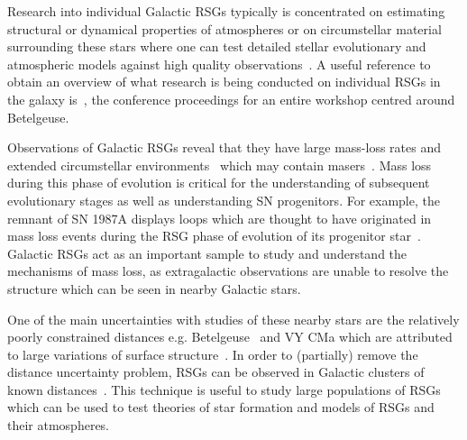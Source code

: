 
Research into individual Galactic RSGs typically is concentrated on estimating structural or dynamical properties of atmospheres or on circumstellar material surrounding these stars where one can test detailed stellar evolutionary and atmospheric models against high quality observations~\citep[e.g.][]{2014A&A...561A..15C}.
A useful reference to obtain an overview of what research is being conducted on individual RSGs in the galaxy is~\cite{2013EAS....60.....K}, the conference proceedings for an entire workshop centred around Betelgeuse.

Observations of Galactic RSGs reveal that they have large mass-loss rates
\citep[10$^{-(6\pm 1)}$\,M$_{\odot}$\,yr$^{-1}$;][]{Danchi94, Richards13,2016AJ....151...51S} and extended circumstellar environments~\citep{Smith01,2014MNRAS.437L...1W} which may contain masers~\citep[e.g.][]{Schuster06,2012ApJ...744...23Z}.
Mass loss during this phase of evolution is critical for the understanding of subsequent evolutionary stages as well as understanding SN progenitors.
For example, the remnant of SN 1987A displays loops which are thought to have originated in mass loss events during the RSG phase of evolution of its progenitor star~\citep[][and references therein]{Humphreys13}.
Galactic RSGs act as an important sample to study and understand the mechanisms of mass loss, as extragalactic observations are unable to resolve the structure which can be seen in nearby Galactic stars.

One of the main uncertainties with studies of these nearby stars are the relatively poorly constrained distances e.g. Betelgeuse~\citep[197\,$\pm$\,45\,pc;][]{Harper08} and VY CMa
\citep[$\sim$1300\,$\pm$\,120\,pc;][]{Wittowski12,2012ApJ...744...23Z} which are attributed to large variations of surface structure~\citep{2011A&A...528A.120C}.
In order to (partially) remove the distance uncertainty problem, RSGs can be observed in Galactic clusters of known distances~\citep[e.g.][]{Humphreys78, Mel'Nik95}.
This technique is useful to study large populations of RSGs which can be used to test theories of star formation and models of RSGs and their atmospheres.


